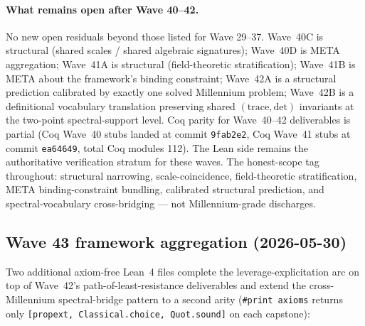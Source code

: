 \paragraph{What remains open after Wave 40--42.} No new open residuals
beyond those listed for Wave 29--37. Wave~40C is structural (shared
scales / shared algebraic signatures); Wave~40D is META aggregation;
Wave~41A is structural (field-theoretic stratification); Wave~41B is
META about the framework's binding constraint; Wave~42A is a
structural prediction calibrated by exactly one solved Millennium
problem; Wave~42B is a definitional vocabulary translation
preserving shared $(\mathrm{trace}, \mathrm{det})$ invariants at
the two-point spectral-support level. Coq parity for Wave~40--42
deliverables is partial (Coq Wave~40 stubs landed at commit
\texttt{9fab2e2}, Coq Wave~41 stubs at commit \texttt{ea64649},
total Coq modules 112). The Lean side remains the authoritative
verification stratum for these waves. The honest-scope tag
throughout: structural narrowing, scale-coincidence, field-theoretic
stratification, META binding-constraint bundling, calibrated
structural prediction, and spectral-vocabulary cross-bridging
--- not Millennium-grade discharges.

\subsection{Wave 43 framework aggregation (2026-05-30)}
\label{subsec:wave43-aggregation}

Two additional axiom-free Lean~4 files complete the
leverage-explicitation arc on top of Wave~42's path-of-least-resistance
deliverables and extend the cross-Millennium spectral-bridge pattern
to a second arity (\texttt{\#print axioms} returns only
\texttt{[propext, Classical.choice, Quot.sound]} on each capstone):

